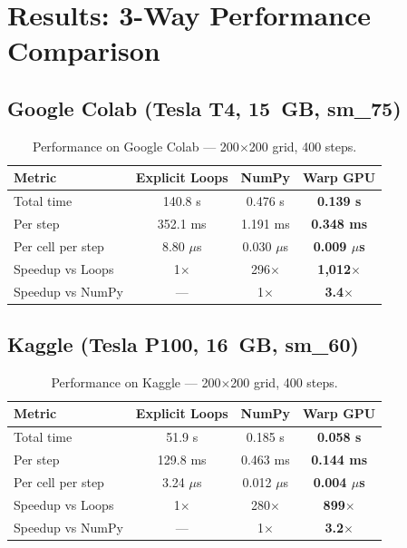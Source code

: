 \documentclass[11pt,a4paper]{article}
\begin{document}
\section{Results: 3-Way Performance Comparison}

\subsection{Google Colab (Tesla T4, 15~GB, sm\_75)}

\begin{table}[H]
\centering
\caption{Performance on Google Colab --- 200$\times$200 grid, 400 steps.}
\begin{tabular}{@{}lccc@{}}
\toprule
\textbf{Metric} & \textbf{Explicit Loops} & \textbf{NumPy} & \textbf{Warp GPU} \\
\midrule
Total time & 140.8 s & 0.476 s & \textbf{0.139 s} \\
Per step & 352.1 ms & 1.191 ms & \textbf{0.348 ms} \\
Per cell per step & 8.80 $\mu$s & 0.030 $\mu$s & \textbf{0.009 $\mu$s} \\
\midrule
Speedup vs Loops & 1$\times$ & 296$\times$ & \textbf{1,012$\times$} \\
Speedup vs NumPy & --- & 1$\times$ & \textbf{3.4$\times$} \\
\bottomrule
\end{tabular}
\end{table}

\subsection{Kaggle (Tesla P100, 16~GB, sm\_60)}

\begin{table}[H]
\centering
\caption{Performance on Kaggle --- 200$\times$200 grid, 400 steps.}
\begin{tabular}{@{}lccc@{}}
\toprule
\textbf{Metric} & \textbf{Explicit Loops} & \textbf{NumPy} & \textbf{Warp GPU} \\
\midrule
Total time & 51.9 s & 0.185 s & \textbf{0.058 s} \\
Per step & 129.8 ms & 0.463 ms & \textbf{0.144 ms} \\
Per cell per step & 3.24 $\mu$s & 0.012 $\mu$s & \textbf{0.004 $\mu$s} \\
\midrule
Speedup vs Loops & 1$\times$ & 280$\times$ & \textbf{899$\times$} \\
Speedup vs NumPy & --- & 1$\times$ & \textbf{3.2$\times$} \\
\bottomrule
\end{tabular}
\end{table}
\end{document}
